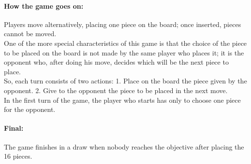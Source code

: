 \documentclass[a4paper,11pt]{article}
\begin{document}
		\paragraph{How the game goes on:} Players move alternatively, placing one piece on the board; once inserted, pieces cannot be moved. \\
		One of the more special characteristics of this game is that the choice of the piece to be placed on the board is not made by the same player who places it; it is the opponent who, after doing his move, decides which will be the next piece to place. \\
		So, each turn consists of two actions: 1. Place on the board the piece given by the opponent. 2. Give to the opponent the piece to be placed in the next move. \\
		In the first turn of the game, the player who starts has only to choose one piece for the opponent.

		\paragraph{Final:} The game finishes in a draw when nobody reaches the objective after placing the 16 pieces.
\end{document}
